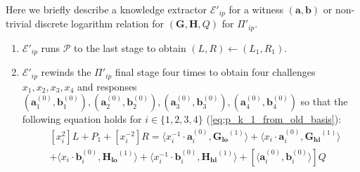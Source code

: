 \documentclass[../../book.tex]{subfiles}
\begin{document}
Here we briefly describe a knowledge extractor $\mathcal{E}'_{ip}$ for a witness $(\mathbf{a}, \mathbf{b})$ or non-trivial discrete logarithm relation for $(\mathbf{G, H}, Q)$ for $\Pi'_{ip}$. 
\begin{enumerate}
    \item $\mathcal{E}'_{ip}$ runs $\mathcal{P}$ to the last stage to obtain $(L, R) \gets (L_1, R_1)$.
    \item $\mathcal{E}'_{ip}$ rewinds the $\Pi'_{ip}$ final stage four times to obtain four challenges $x_1, x_2, x_3, x_4$ and responses $(\mathbf{a}_1^{(0)}, \mathbf{b}_1^{(0)}), (\mathbf{a}_2^{(0)}, \mathbf{b}_2^{(0)}), (\mathbf{a}_3^{(0)}, \mathbf{b}_3^{(0)}), (\mathbf{a}_4^{(0)}, \mathbf{b}_4^{(0)})$ so that the following equation holds for $i \in \{ 1,2,3,4 \}$ (\ref{eq:p_k_1_from_old_basis}):
    \begin{equation}
        \begin{aligned}
            & [x_i^2]L + P_1 + [x_i^{-2}]R = \langle x_i^{-1} \cdot \mathbf{a}_i^{(0)}, \mathbf{G_{lo}}^{(1)} \rangle + \langle x_i \cdot \mathbf{a}_i^{(0)}, \mathbf{G_{hi}}^{(1)} \rangle \\
            &+ \langle x_i \cdot \mathbf{b}_i^{(0)}, \mathbf{H_{lo}}^{(1)} \rangle + \langle x_i^{-1} \cdot \mathbf{b}_i^{(0)}, \mathbf{H_{hi}}^{(1)} \rangle + [\langle \mathbf{a}_i^{(0)}, \mathbf{b}_i^{(0)} \rangle]Q
        \end{aligned}
        \label{eq:extractor_eq}
    \end{equation}


\end{enumerate}
\end{document}
